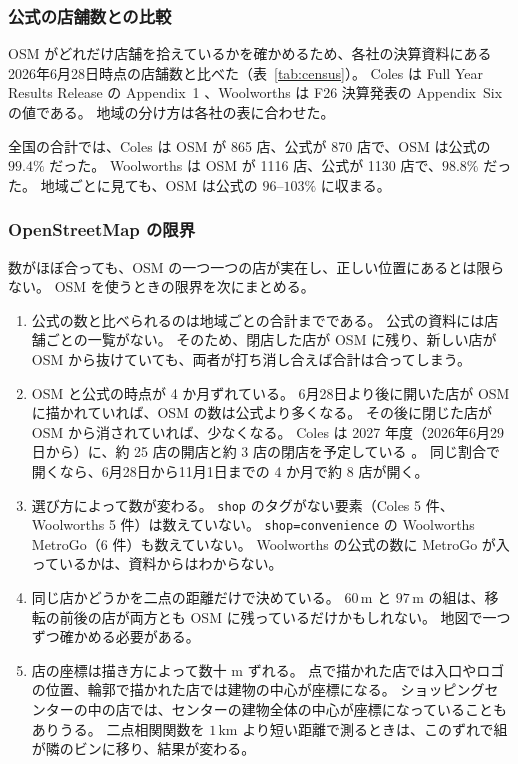 \documentclass[a4paper,11pt]{ltjsarticle}
\newcommand{\code}[1]{\textcolor{codecolor}{\texttt{#1}}}
\begin{document}
\subsubsection{公式の店舗数との比較}
\label{sec:official}

OSM がどれだけ店舗を拾えているかを確かめるため、各社の決算資料にある 2026年6月28日時点の店舗数と比べた（表~\ref{tab:census}）。
Coles は Full Year Results Release の Appendix~1 \cite{ColesFY26}、Woolworths は F26 決算発表の Appendix~Six \cite{WoolworthsF26} の値である。
地域の分け方は各社の表に合わせた。
\begin{table}[t]
  \centering
  \caption{地域ごとの店舗数。OSM は 2026年11月1日、公式は 2026年6月28日時点。}
  \label{tab:census}
  
\end{table}
全国の合計では、Coles は OSM が 865 店、公式が 870 店で、OSM は公式の $99.4\%$ だった。
Woolworths は OSM が 1116 店、公式が 1130 店で、$98.8\%$ だった。
地域ごとに見ても、OSM は公式の $96$--$103\%$ に収まる。

\subsubsection{OpenStreetMap の限界}
\label{sec:osm-limits}

数がほぼ合っても、OSM の一つ一つの店が実在し、正しい位置にあるとは限らない。
OSM を使うときの限界を次にまとめる。
\begin{enumerate}
  \item 公式の数と比べられるのは地域ごとの合計までである。
    公式の資料には店舗ごとの一覧がない。
    そのため、閉店した店が OSM に残り、新しい店が OSM から抜けていても、両者が打ち消し合えば合計は合ってしまう。
  \item OSM と公式の時点が 4 か月ずれている。
    6月28日より後に開いた店が OSM に描かれていれば、OSM の数は公式より多くなる。
    その後に閉じた店が OSM から消されていれば、少なくなる。
    Coles は 2027 年度（2026年6月29日から）に、約 25 店の開店と約 3 店の閉店を予定している \cite{ColesFY26}。
    同じ割合で開くなら、6月28日から11月1日までの 4 か月で約 8 店が開く。
  \item 選び方によって数が変わる。
    \code{shop} のタグがない要素（Coles 5 件、Woolworths 5 件）は数えていない。
    \code{shop=convenience} の Woolworths MetroGo（6 件）も数えていない。
    Woolworths の公式の数に MetroGo が入っているかは、資料からはわからない。
  \item 同じ店かどうかを二点の距離だけで決めている。
    $60\,\mathrm{m}$ と $97\,\mathrm{m}$ の組は、移転の前後の店が両方とも OSM に残っているだけかもしれない。
    地図で一つずつ確かめる必要がある。
  \item 店の座標は描き方によって数十 $\mathrm{m}$ ずれる。
    点で描かれた店では入口やロゴの位置、輪郭で描かれた店では建物の中心が座標になる。
    ショッピングセンターの中の店では、センターの建物全体の中心が座標になっていることもありうる。
    二点相関関数を $1\,\mathrm{km}$ より短い距離で測るときは、このずれで組が隣のビンに移り、結果が変わる。
\end{enumerate}
\end{document}
